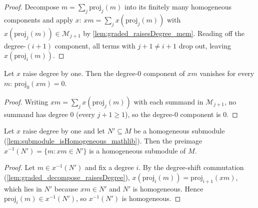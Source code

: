 \begin{proof}
  \leanok
  Decompose \(m = \sum_j \mathrm{proj}_j(m)\) into its finitely many homogeneous
  components and apply \(x\): \(x m = \sum_j x(\mathrm{proj}_j(m))\) with
  \(x(\mathrm{proj}_j(m)) \in \mathcal{M}_{j+1}\) by
  \cref{lem:graded_raisesDegree_mem}. Reading off the degree-\((i+1)\) component, all
  terms with \(j+1 \ne i+1\) drop out, leaving \(x(\mathrm{proj}_i(m))\).
\end{proof}

\begin{lemma}
  \label{lem:graded_decompose_raisesDegree_zero}
  Let \(x\) raise degree by one. Then the degree-\(0\) component of \(x m\) vanishes
  for every \(m\): \(\mathrm{proj}_0(x m) = 0\).
\end{lemma}

\begin{proof}
  \leanok
  Writing \(x m = \sum_j x(\mathrm{proj}_j(m))\) with each summand in
  \(\mathcal{M}_{j+1}\), no summand has degree \(0\) (every \(j+1 \ge 1\)), so the
  degree-\(0\) component is \(0\).
\end{proof}

\begin{lemma}
  \label{lem:graded_comap_isHomogeneous}
  Let \(x\) raise degree by one and let \(N' \subseteq M\) be a homogeneous submodule
  (\cref{lem:submodule_isHomogeneous_mathlib}). Then the preimage \(x^{-1}(N') =
  \{m : x m \in N'\}\) is a homogeneous submodule of \(M\).
\end{lemma}

\begin{proof}
  \leanok
  Let \(m \in x^{-1}(N')\) and fix a degree \(i\). By the degree-shift commutation
  (\cref{lem:graded_decompose_raisesDegree}), \(x(\mathrm{proj}_i(m)) =
  \mathrm{proj}_{i+1}(x m)\), which lies in \(N'\) because \(x m \in N'\) and \(N'\)
  is homogeneous. Hence \(\mathrm{proj}_i(m) \in x^{-1}(N')\), so \(x^{-1}(N')\) is
  homogeneous.
\end{proof}

